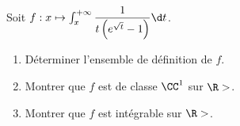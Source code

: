 \begin{enonce}
\begin{exercise}[ID={RMS124 E677 Mines-Ponts},subtitle={},tags={}, difficulty={0}]
Soit $f:x\mapsto \int_x^{+\infty} \dfrac{1}{t\left( e^{\sqrt{t}} - 1 \right)}\d t$.
\begin{enumerate}
  \item Déterminer l'ensemble de définition de $f$.
  \item Montrer que $f$ est de classe $\CC^1$ sur $\R>$.
  \item Montrer que $f$ est intégrable sur $\R>$.
\end{enumerate}
\end{exercise}
\begin{solution}
\end{solution}
\end{enonce}
